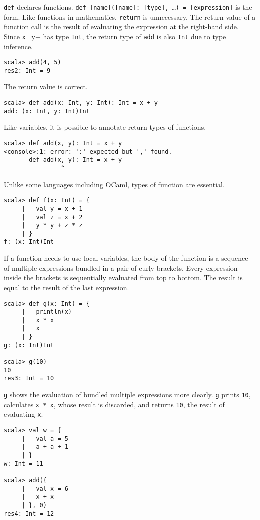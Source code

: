 \verb+def+ declares functions. \verb+def [name]([name]: [type], …) = [expression]+ is
the form. Like functions in mathematics, \verb+return+ is unnecessary. The return
value of a function call is the result of evaluating the expression at the
right-hand side. Since \verb+x + y+ has type \verb+Int+, the return type of \verb+add+ is
also \verb+Int+ due to type inference.

\begin{verbatim}
scala> add(4, 5)
res2: Int = 9
\end{verbatim}

The return value is correct.

\begin{verbatim}
scala> def add(x: Int, y: Int): Int = x + y
add: (x: Int, y: Int)Int
\end{verbatim}

Like variables, it is possible to annotate return types of functions.

\begin{verbatim}
scala> def add(x, y): Int = x + y
<console>:1: error: ':' expected but ',' found.
       def add(x, y): Int = x + y
                ^
\end{verbatim}

Unlike some languages including OCaml, types of function  are essential.

\begin{verbatim}
scala> def f(x: Int) = {
     |   val y = x + 1
     |   val z = x + 2
     |   y * y + z * z
     | }
f: (x: Int)Int
\end{verbatim}

If a function needs to use local variables, the body of the function is a
sequence of multiple expressions bundled in a pair of curly brackets. Every
expression inside the brackets is sequentially evaluated from top to bottom.
The result is equal to the result of the last expression.

\begin{verbatim}
scala> def g(x: Int) = {
     |   println(x)
     |   x * x
     |   x
     | }
g: (x: Int)Int

scala> g(10)
10
res3: Int = 10
\end{verbatim}

\verb+g+ shows the evaluation of bundled multiple expressions more clearly. \verb+g+
prints \verb+10+, calculates \verb+x * x+, whose result is discarded, and returns \verb+10+,
the result of evaluating \verb+x+.

\begin{verbatim}
scala> val w = {
     |   val a = 5
     |   a + a + 1
     | }
w: Int = 11

scala> add({
     |   val x = 6
     |   x + x
     | }, 0)
res4: Int = 12
\end{verbatim}

